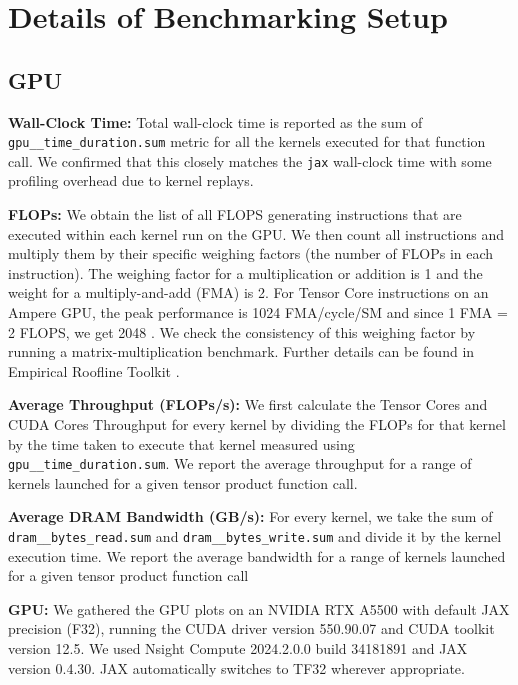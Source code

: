 \section{Details of Benchmarking Setup}
\label{sec:benchmark_details}


\subsection{GPU}


\textbf{Wall-Clock Time:} Total wall-clock time is reported as the sum of \texttt{gpu\_\_time\_duration.sum} metric for all the kernels executed for that function call. We confirmed that this closely matches the \texttt{jax} wall-clock time with some profiling overhead due to kernel replays. 

\textbf{FLOPs:} We obtain the list of all FLOPS generating instructions that are executed within each kernel run on the GPU. We then count all instructions and multiply them by their specific weighing factors (the number of FLOPs in each instruction). The weighing factor for a multiplication or addition is 1 and the weight for a multiply-and-add (FMA) is 2. For Tensor Core instructions on an Ampere GPU, the peak performance is 1024 FMA/cycle/SM and since 1 FMA = 2 FLOPS, we get 2048 \citep{throughputcomment}. We check the consistency of this weighing factor by running a matrix-multiplication benchmark. Further details can be found in Empirical Roofline Toolkit \citep{deephierarchicalrooflineperformanceanalysis}.

\textbf{Average Throughput (FLOPs/s):} We first calculate the Tensor Cores and CUDA Cores Throughput for every kernel by dividing the FLOPs for that kernel by the time taken to execute that kernel measured using \texttt{gpu\_\_time\_duration.sum}. We report the average throughput for a range of kernels launched for a given tensor product function call.


\textbf{Average DRAM Bandwidth (GB/s):} For every kernel, we take the sum of \texttt{dram\_\_bytes\_read.sum} and \texttt{dram\_\_bytes\_write.sum} and divide it by the kernel execution time. We report the average bandwidth for a range of kernels launched for a given tensor product function call

\textbf{GPU:} We gathered the GPU plots on an NVIDIA RTX A5500 with default JAX precision (F32), running the CUDA driver version 550.90.07 and CUDA toolkit version 12.5.  We used Nsight Compute 2024.2.0.0 build 34181891 and JAX version 0.4.30. JAX automatically switches to TF32 wherever appropriate.

